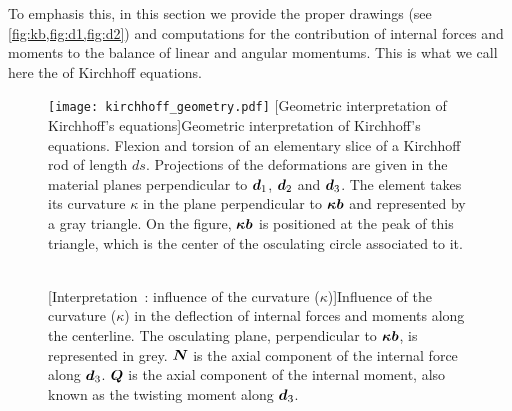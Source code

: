 To emphasis this, in this section we provide the proper drawings (see \cref{fig:kb,fig:d1,fig:d2}) and computations for the contribution of internal forces and moments to the balance of linear and angular momentums. This is what we call here the  of Kirchhoff equations.
\begin{figure}[p]
  \begin{fullpage}
	\centering
	\texttt{[image: kirchhoff\_geometry.pdf]}
	[Geometric interpretation of Kirchhoff's equations]{Geometric interpretation of Kirchhoff's equations. Flexion and torsion of an elementary slice of a Kirchhoff rod of length $ds$. Projections of the deformations are given in the material planes perpendicular to $\boldsymbol{d}_1$, $\boldsymbol{d}_2$ and $\boldsymbol{d}_3$. The element takes its curvature $\kappa$ in the plane perpendicular to $\boldsymbol{\kappa b}$ and represented by a gray triangle. On the figure, $\boldsymbol{\kappa b}$ is positioned at the peak of this triangle, which is the center of the osculating circle associated to it.}
	\label{fig:slice}
 \end{fullpage}
\end{figure}
\begin{figure}[p]
  \begin{leftfullpage}
    \captionsetup[subfloat]{captionskip=10pt}
     	\centering
     	 \\
	\vspace{30pt}
	\vspace{30pt}
	[Interpretation~: influence of the curvature ($\kappa$)]{Influence of the curvature ($\kappa$) in the deflection of internal forces and moments along the centerline. The osculating plane, perpendicular to $\boldsymbol{\kappa b}$, is represented in grey. $\boldsymbol{N}$ is the axial component of the internal force along $\boldsymbol{d}_3$. $\boldsymbol{Q}$ is the axial component of the internal moment, also known as the twisting moment along $\boldsymbol{d}_3$.}
	\label{fig:kb}
 \end{leftfullpage}
\end{figure}
